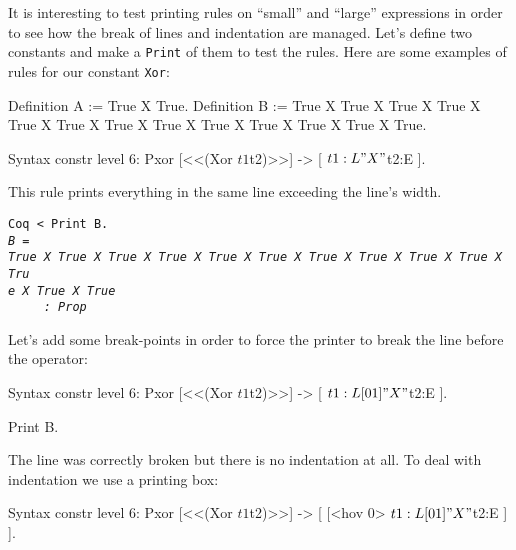 \begin{enumerate}
It is interesting to test printing rules on ``small'' and ``large''
expressions in order to see how the break of lines and indentation are
managed. Let's define two constants and make a \verb+Print+ of them to
test the rules.  Here are some examples of rules for our constant
\verb+Xor+:

\begin{coq_example*} 
Definition A := True X True.
Definition B := True X True X True X True X True X True X True 
                 X True X True X True X True X True X True.
\end{coq_example*}
\begin{coq_example*}
Syntax constr level 6:
  Pxor [<<(Xor $t1 $t2)>>] -> [ $t1:L " X " $t2:E ].
\end{coq_example*}


This rule prints everything in the same line exceeding the line's
width.


\begin{small}
\begin{flushleft}
\verb!Coq < Print B.!\\
\texttt{\textit{B~=~}}\\
\texttt{\textit{True~X~True~X~True~X~True~X~True~X~True~X~True~X~True~X~True~X~True~X~Tru}}\\
\texttt{\textit{e~X~True~X~True}}\\
\texttt{\textit{~~~~~:~Prop}}\\
\end{flushleft}
\end{small}

Let's add some break-points in order to force the printer to break the
line before the operator:

\begin{coq_example*}
Syntax constr level 6:
  Pxor [<<(Xor $t1 $t2)>>] -> [ $t1:L [0 1] " X " $t2:E ].
\end{coq_example*}

\begin{coq_example}
Print B.
\end{coq_example}

The line was correctly broken but there is no indentation at all. To
deal with indentation we use a printing box:

\begin{coq_example*}
Syntax constr level 6:
  Pxor [<<(Xor $t1 $t2)>>] ->
   [ [<hov 0> $t1:L [0 1] " X " $t2:E ] ].
\end{coq_example*}


\end{enumerate}
